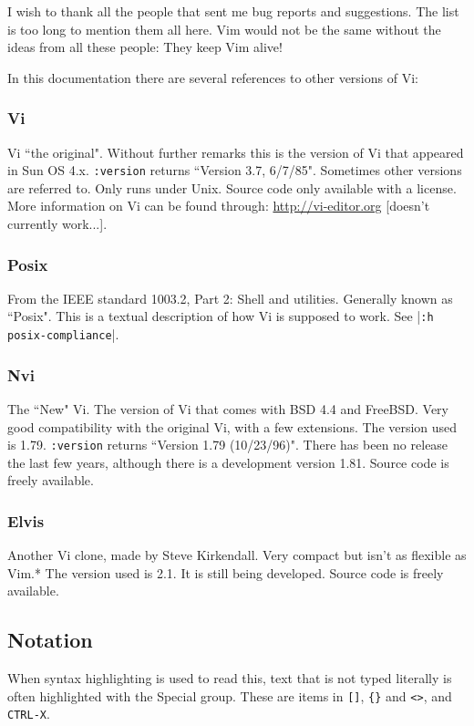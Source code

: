 I wish to thank all the people that sent me bug reports and suggestions.
The list is too long to mention them all here.
Vim would not be the same without the ideas from all these people: They keep Vim alive!

In this documentation there are several references to other versions of Vi:

\subsubsection{Vi}
\label{Vi}
\label{vi}
Vi ``the original".
Without further remarks this is the version of Vi that appeared in Sun OS 4.x.
\texttt{:version} returns ``Version 3.7, 6/7/85".
Sometimes other versions are referred to.
Only runs under Unix.
Source code only available with a license.
More information on Vi can be found through: \url{http://vi-editor.org} [doesn't currently work...].

\subsubsection{Posix}
\label{Posix}
From the IEEE standard 1003.2, Part 2: Shell and utilities.
Generally known as ``Posix".
This is a textual description of how Vi is supposed to work.
See |\texttt{:h posix-compliance}|.

\subsubsection{Nvi}
\label{Nvi}
The ``New" Vi.
The version of Vi that comes with BSD 4.4 and FreeBSD.
Very good compatibility with the original Vi, with a few extensions.
The version used is 1.79.
\texttt{:version} returns ``Version 1.79 (10/23/96)".
There has been no release the last few years, although there is a development version 1.81.
Source code is freely available.

\subsubsection{Elvis}
\label{Elvis}
Another Vi clone, made by Steve Kirkendall.
Very compact but isn't as flexible as Vim.*
The version used is 2.1.
It is still being developed.
Source code is freely available.

\subsection{Notation}
\label{notation}
When syntax highlighting is used to read this, text that is not typed literally is often highlighted with the Special group.
These are items in \texttt{[]}, \texttt{\{\}} and \texttt{<>}, and \texttt{CTRL-X}.

